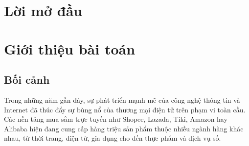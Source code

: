 \documentclass{report}
\makeatletter
\let\ps@plain\ps@fancy
\makeatother
\begin{document}

\newpage
\chapter*{Lời mở đầu}
\thispagestyle{empty}

\clearpage
\makeatletter
\let\ps@plain\ps@empty
\makeatother
{}
\listoffigures
\makeatletter
\let\ps@plain\ps@empty
\makeatother
\clearpage

\clearpage
\makeatletter
\let\ps@plain\ps@empty
\makeatother
{}
\listoftables
\makeatletter
\let\ps@plain\ps@empty
\makeatother
\clearpage

\clearpage
\makeatletter
\let\ps@plain\ps@empty
\makeatother
\pagestyle{empty}
\tableofcontents
\thispagestyle{empty}
\makeatletter
\let\ps@plain\ps@fancy
\makeatother
\clearpage

\pagestyle{fancy}

\newpage
\chapter{Giới thiệu bài toán}
\label{chap:gioithieu}

\section{Bối cảnh}

Trong những năm gần đây, sự phát triển mạnh mẽ của công nghệ thông tin và Internet đã thúc đẩy sự bùng nổ của thương mại điện tử trên phạm vi toàn cầu. Các nền tảng mua sắm trực tuyến như Shopee, Lazada, Tiki, Amazon hay Alibaba hiện đang cung cấp hàng triệu sản phẩm thuộc nhiều ngành hàng khác nhau, từ thời trang, điện tử, gia dụng cho đến thực phẩm và dịch vụ số.
\end{document}
